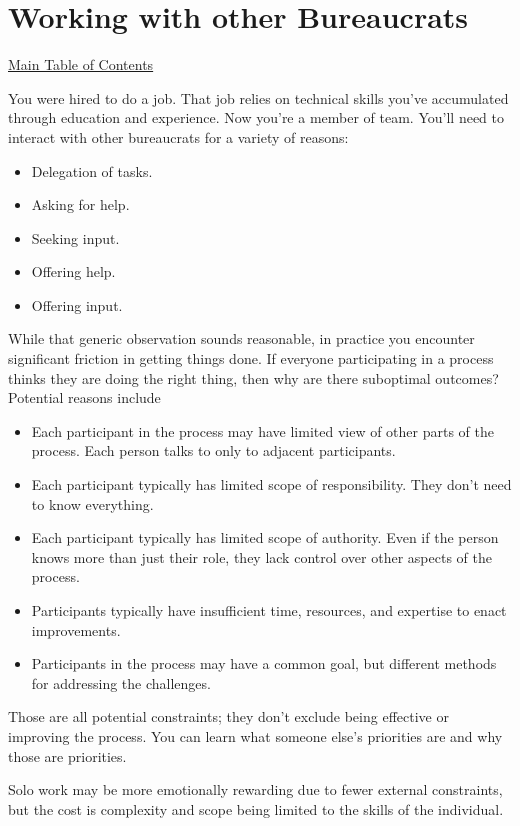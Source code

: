 \chapter{Working with other Bureaucrats\label{sec:working-with-other-bureaucrats}}
{\footnotesize\hyperref[sec:toc]{Main Table of Contents}}
\minitoc 

You were hired to do a job. That job relies on technical skills you've accumulated through education and experience. Now you're a member of team. You'll need to interact with other bureaucrats for a variety of reasons:
\begin{itemize}
    \item Delegation of tasks.
    \item Asking for help.
    \item Seeking input.
    \item Offering help.
    \item Offering input.
\end{itemize}
While that generic observation sounds reasonable, in practice you encounter significant friction in getting things done. 
If everyone participating in a process thinks they are doing the right thing, then why are there suboptimal outcomes? Potential reasons include
\begin{itemize}
    \item Each participant in the process may have limited view of other parts of the process. Each person talks to only to adjacent participants.
    \item Each participant typically has limited scope of responsibility. They don't need to know everything. 
    \item Each participant typically has limited scope of authority. Even if the person knows more than just their role, they lack control over other aspects of the process.
    \item Participants typically have insufficient time, resources, and expertise to enact improvements.
    \item Participants in the process may have a common goal, but different methods for addressing the challenges.
\end{itemize}
Those are all potential constraints; they don't exclude being effective or improving the process. 
You can learn what someone else's priorities are and why those are priorities.

Solo work may be more emotionally rewarding due to fewer external constraints, but the cost is complexity and scope being limited to the skills of the individual. 


